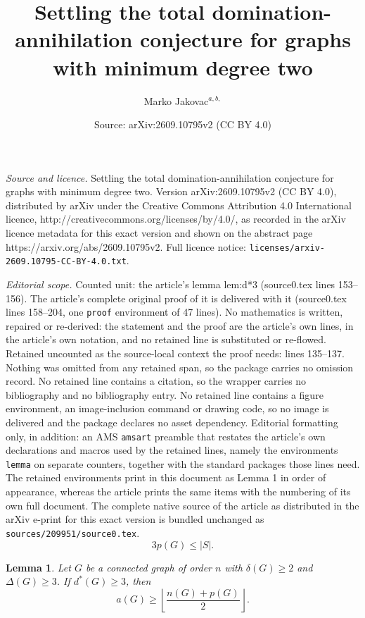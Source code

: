 \documentclass[10pt,a4paper]{amsart}
\title{Settling the total domination-annihilation conjecture for graphs with minimum degree two}
\author{Marko Jakovac$^{a,b,}$}
\date{Source: arXiv:2609.10795v2 (CC BY 4.0)}
\newtheorem{lemma}{Lemma}
\begin{document}
\maketitle

\noindent\emph{Source and licence.} Settling the total domination-annihilation conjecture for graphs with minimum degree two. Version arXiv:2609.10795v2 (CC BY 4.0), distributed by arXiv under the Creative Commons Attribution 4.0 International licence, http://creativecommons.org/licenses/by/4.0/, as recorded in the arXiv licence metadata for this exact version and shown on the abstract page https://arxiv.org/abs/2609.10795v2. Full licence notice: \texttt{licenses/arxiv-2609.10795-CC-BY-4.0.txt}.\par\smallskip

\noindent\textit{Editorial scope.} Counted unit: the article's lemma lem:d*3 (source0.tex lines 153--156). The article's complete original proof of it is delivered with it (source0.tex lines 158--204, one \texttt{proof} environment of 47 lines). No mathematics is written, repaired or re-derived: the statement and the proof are the article's own lines, in the article's own notation, and no retained line is substituted or re-flowed.  Retained uncounted as the source-local context the proof needs: lines 135--137.  Nothing was omitted from any retained span, so the package carries no omission record.  No retained line contains a citation, so the wrapper carries no bibliography and no bibliography entry.  No retained line contains a figure environment, an image-inclusion command or drawing code, so no image is delivered and the package declares no asset dependency.  Editorial formatting only, in addition: an AMS \texttt{amsart} preamble that restates the article's own declarations and macros used by the retained lines, namely the environments \texttt{lemma} on separate counters, together with the standard packages those lines need.  The retained environments print in this document as Lemma 1 in order of appearance, whereas the article prints the same items with the numbering of its own full document.  The complete native source of the article as distributed in the arXiv e-print for this exact version is bundled unchanged as \texttt{sources/209951/source0.tex}.
\begin{equation}\label{eq:p-s}
3p(G)\le |S|.
\end{equation}

\begin{lemma}\label{lem:d*3}
Let $G$ be a connected graph of order $n$ with $\delta(G)\ge 2$ and $\Delta(G)\ge 3$. If $d^*(G)\ge3$, then
$$a(G)\ge \left\lfloor\frac{n(G)+p(G)}2\right\rfloor.$$
\end{lemma}
\end{document}

